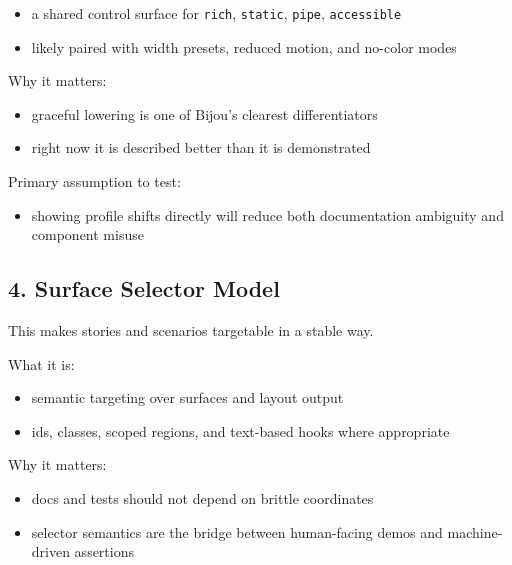 \begin{itemize}
\tightlist
\item
  a shared control surface for \texttt{r\allowbreak{}i\allowbreak{}c\allowbreak{}h}, \texttt{s\allowbreak{}t\allowbreak{}a\allowbreak{}t\allowbreak{}i\allowbreak{}c}, \texttt{p\allowbreak{}i\allowbreak{}p\allowbreak{}e}, \texttt{a\allowbreak{}c\allowbreak{}c\allowbreak{}e\allowbreak{}s\allowbreak{}s\allowbreak{}i\allowbreak{}b\allowbreak{}l\allowbreak{}e}
\item
  likely paired with width presets, reduced motion, and no-color modes
\end{itemize}

Why it matters:

\begin{itemize}
\tightlist
\item
  graceful lowering is one of Bijou's clearest differentiators
\item
  right now it is described better than it is demonstrated
\end{itemize}

Primary assumption to test:

\begin{itemize}
\tightlist
\item
  showing profile shifts directly will reduce both documentation ambiguity and component misuse
\end{itemize}

\subsection{4. Surface Selector Model}\label{record-042-surface-selector-model}

This makes stories and scenarios targetable in a stable way.

What it is:

\begin{itemize}
\tightlist
\item
  semantic targeting over surfaces and layout output
\item
  ids, classes, scoped regions, and text-based hooks where appropriate
\end{itemize}

Why it matters:

\begin{itemize}
\tightlist
\item
  docs and tests should not depend on brittle coordinates
\item
  selector semantics are the bridge between human-facing demos and machine-driven assertions
\end{itemize}

